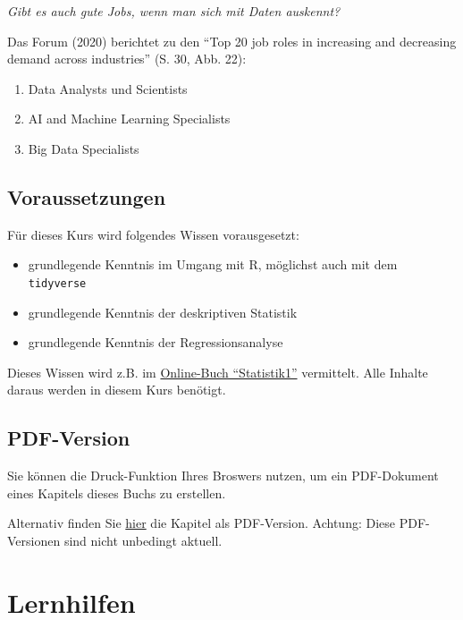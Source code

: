 \documentclass[
  ngerman,
  letterpaper,
]{scrbook}
\providecommand{\tightlist}{%
  \setlength{\itemsep}{0pt}\setlength{\parskip}{0pt}}
\begin{document}
\emph{Gibt es auch gute Jobs, wenn man sich mit Daten auskennt?}

Das Forum (2020) berichtet zu den \enquote{Top 20 job roles in
increasing and decreasing demand across industries} (S. 30, Abb. 22):

\begin{enumerate}
\def\labelenumi{\arabic{enumi}.}
\tightlist
\item
  Data Analysts und Scientists
\item
  AI and Machine Learning Specialists
\item
  Big Data Specialists
\end{enumerate}

\subsection{Voraussetzungen}\label{voraussetzungen}

Für dieses Kurs wird folgendes Wissen vorausgesetzt:

\begin{itemize}
\tightlist
\item
  grundlegende Kenntnis im Umgang mit R, möglichst auch mit dem
  \texttt{tidyverse}
\item
  grundlegende Kenntnis der deskriptiven Statistik
\item
  grundlegende Kenntnis der Regressionsanalyse
\end{itemize}

Dieses Wissen wird z.B. im
\href{https://statistik1.netlify.app/}{Online-Buch \enquote{Statistik1}}
vermittelt. Alle Inhalte daraus werden in diesem Kurs benötigt.

\subsection{PDF-Version}\label{pdf-version}

Sie können die Druck-Funktion Ihres Broswers nutzen, um ein PDF-Dokument
eines Kapitels dieses Buchs zu erstellen.

Alternativ finden Sie
\href{https://github.com/sebastiansauer/start-bayes/tree/main/pdf}{hier}
die Kapitel als PDF-Version. Achtung: Diese PDF-Versionen sind nicht
unbedingt aktuell.

\section{Lernhilfen}\label{lernhilfen}
\end{document}
